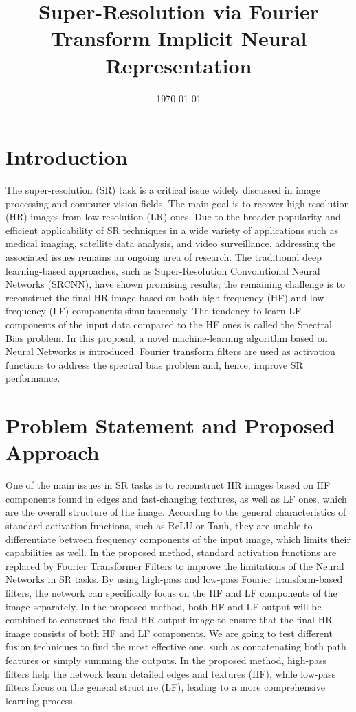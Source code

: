 \documentclass{article}
\title{Super-Resolution via Fourier Transform Implicit Neural Representation}
\date{\today}
\begin{document}
\maketitle

\section{Introduction}
The super-resolution (SR) task is a critical issue widely discussed in image processing and computer vision fields. The main goal is to recover high-resolution (HR) images from low-resolution (LR) ones. Due to the broader popularity and efficient applicability of SR techniques in a wide variety of applications such as medical imaging, satellite data analysis, and video surveillance, addressing the associated issues remains an ongoing area of research. The traditional deep learning-based approaches, such as Super-Resolution Convolutional Neural Networks (SRCNN), have shown promising results; the remaining challenge is to reconstruct the final HR image based on both high-frequency (HF) and low-frequency (LF) components simultaneously. The tendency to learn LF components of the input data compared to the HF ones is called the Spectral Bias problem. 
In this proposal, a novel machine-learning algorithm based on Neural Networks is introduced. Fourier transform filters are used as activation functions to address the spectral bias problem and, hence, improve SR performance.

\section{Problem Statement and Proposed Approach}
One of the main issues in SR tasks is to reconstruct HR images based on HF components found in edges and fast-changing textures, as well as LF ones, which are the overall structure of the image. According to the general characteristics of standard activation functions, such as ReLU or Tanh, they are unable to differentiate between frequency components of the input image, which limits their capabilities as well. In the proposed method, standard activation functions are replaced by Fourier Transformer Filters to improve the limitations of the Neural Networks in SR tasks. By using high-pass and low-pass Fourier transform-based filters, the network can specifically focus on the HF and LF components of the image separately. In the proposed method, both HF and LF output will be combined to construct the final HR output image to ensure that the final HR image consists of both HF and LF components. We are going to test different fusion techniques to find the most effective one, such as concatenating both path features or simply summing the outputs. In the proposed method, high-pass filters help the network learn detailed edges and textures (HF), while low-pass filters focus on the general structure (LF), leading to a more comprehensive learning process.
\end{document}
